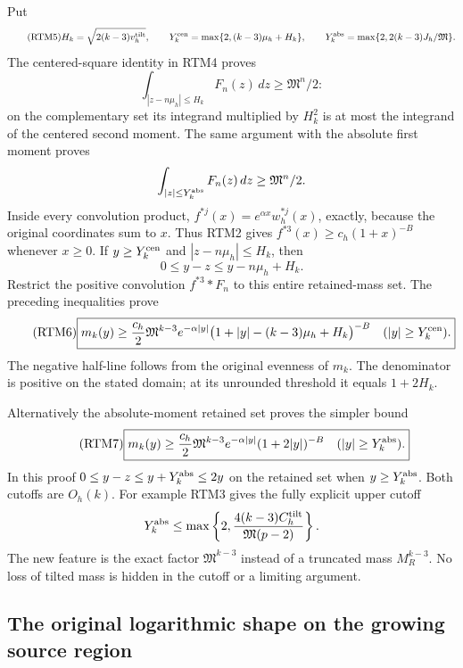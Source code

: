 \documentclass[11pt,a4paper]{article}
\begin{document}
Put
\begin{equation}\tag{RTM5}
 H_k=\sqrt{2(k-3)v_h^{\rm tilt}},\qquad
 Y_k^{\rm cen}=\max\{2,(k-3)\mu_h+H_k\},\qquad
 Y_k^{\rm abs}=\max\{2,2(k-3)J_h/\mathfrak M\}.
\end{equation}
The centered-square identity in RTM4 proves
\[
 \int_{|z-n\mu_h|\le H_k}F_n(z)\,dz\ge\mathfrak M^n/2:
\]
on the complementary set its integrand multiplied by $H_k^2$ is at
most the integrand of the centered second moment.  The same argument
with the absolute first moment proves
\[
 \int_{|z|\le Y_k^{\rm abs}}F_n(z)\,dz\ge\mathfrak M^n/2.
\]
Inside every convolution product,
$f^{*j}(x)=e^{\alpha x}w_h^{*j}(x)$, exactly, because the original
coordinates sum to $x$.  Thus RTM2 gives
$f^{*3}(x)\ge c_h(1+x)^{-B}$ whenever $x\ge0$.
If $y\ge Y_k^{\rm cen}$ and $|z-n\mu_h|\le H_k$, then
\[
 0\le y-z\le y-n\mu_h+H_k.
\]
Restrict the positive convolution $f^{*3}*F_n$ to this entire
retained-mass set.  The preceding inequalities prove
\begin{equation}\tag{RTM6}
 \boxed{m_k(y)\ge\frac{c_h}{2}\mathfrak M^{k-3}e^{-\alpha|y|}
 \bigl(1+|y|-(k-3)\mu_h+H_k\bigr)^{-B}
 \quad(|y|\ge Y_k^{\rm cen}).}
\end{equation}
The negative half-line follows from the original evenness of $m_k$.
The denominator is positive on the stated domain; at its unrounded
threshold it equals $1+2H_k$.

Alternatively the absolute-moment retained set proves the simpler bound
\begin{equation}\tag{RTM7}
 \boxed{m_k(y)\ge\frac{c_h}{2}\mathfrak M^{k-3}e^{-\alpha|y|}
 (1+2|y|)^{-B}\quad(|y|\ge Y_k^{\rm abs}).}
\end{equation}
In this proof $0\le y-z\le y+Y_k^{\rm abs}\le2y$ on the
retained set when $y\ge Y_k^{\rm abs}$.  Both cutoffs are $O_h(k)$.
For example RTM3 gives the fully explicit upper cutoff
\[
 Y_k^{\rm abs}\le
 \max\left\{2,\frac{4(k-3)C_h^{\rm tilt}}
                         {\mathfrak M(p-2)}\right\}.
\]
The new feature is the exact factor $\mathfrak M^{k-3}$ instead of
a truncated mass $M_R^{k-3}$.  No loss of tilted mass is hidden in
the cutoff or a limiting argument.

\subsection{The original logarithmic shape on the growing source region}
\end{document}

